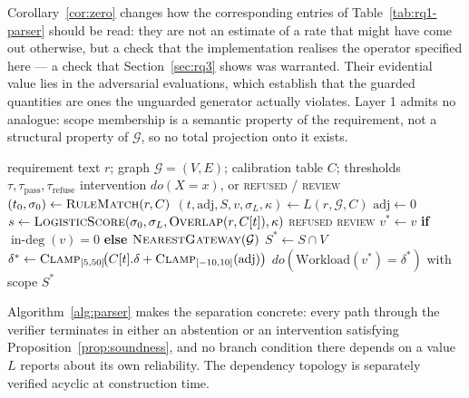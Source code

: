 \documentclass[journal, 10pt]{IEEEtran}
\begin{document}
Corollary~\ref{cor:zero} changes how the corresponding entries of
Table~\ref{tab:rq1-parser} should be read: they are not an estimate of a rate that might
have come out otherwise, but a check that the implementation realises the
operator specified here --- a check that Section~\ref{sec:rq3} shows was
warranted. Their evidential value lies in the adversarial evaluations, which
establish that the guarded quantities are ones the unguarded generator actually
violates. Layer 1 admits no analogue: scope membership is a semantic property of
the requirement, not a structural property of $\mathcal{G}$, so no total
projection onto it exists.

\begin{algorithm}[!t]
\caption{Guarded requirement parsing. The call to $L$ is the non-deterministic generator, invoked on every requirement; everything from \textsc{LogisticScore} onward is the deterministic verifier, which reads no confidence signal produced by $L$.}
\label{alg:parser}
\begin{algorithmic}[1]
\REQUIRE requirement text $r$; graph $\mathcal{G}=(V,E)$; calibration table $C$; thresholds $\tau, \tau_{\text{pass}}, \tau_{\text{refuse}}$
\ENSURE intervention $do(X{=}x)$, or \textsc{refused} / \textsc{review}
\STATE $(t_0, \sigma_0) \leftarrow \textsc{RuleMatch}(r, C)$ 
\STATE $(t,\text{adj},S,v,\sigma_L,\kappa) \leftarrow L(r,\mathcal{G},C)$ 
    \STATE $\text{adj} \leftarrow 0$ 
\ENDIF
\STATE $s \leftarrow \textsc{LogisticScore}(\sigma_0, \sigma_L, \textsc{Overlap}(r, C[t]), \kappa)$
 \RETURN \textsc{refused}
 \RETURN \textsc{review}
\ENDIF
\STATE $v^{*} \leftarrow v$ \textbf{if} $\operatorname{in-deg}(v){=}0$ \textbf{else} $\textsc{NearestGateway}(\mathcal{G})$
\STATE $S^{*} \leftarrow S \cap V$
\STATE $\delta^{*} \leftarrow \textsc{Clamp}_{[5,50]}\!\big(C[t].\delta + \textsc{Clamp}_{[-10,10]}(\text{adj})\big)$
\RETURN $do(\text{Workload}(v^{*}){=}\delta^{*})$ with scope $S^{*}$
\end{algorithmic}
\end{algorithm}

Algorithm~\ref{alg:parser} makes the separation concrete: every path through the
verifier terminates in either an abstention or an intervention satisfying
Proposition~\ref{prop:soundness}, and no branch condition there depends on a
value $L$ reports about its own reliability. The dependency topology is separately
verified acyclic at construction time.
\end{document}
